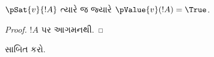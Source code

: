 \documentclass[../../../include/open-logic-section]{subfiles}
\begin{document}
\begin{prop}
  $\pSat{v}{!A}$ ત્યારે જ જ્યારે $\pValue{v}(!A)=\True$.
\end{prop}

\begin{proof}
  $!A$ પર આગમનથી.
\end{proof}

\begin{prob}
   સાબિત કરો.
\end{prob}
\end{document}
